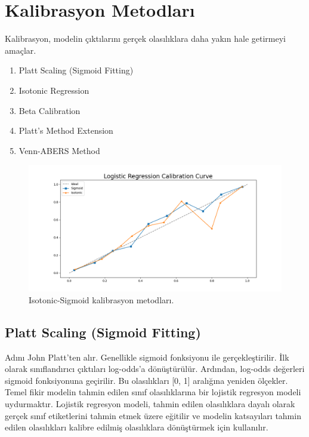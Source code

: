 \section{Kalibrasyon Metodları}
Kalibrasyon, modelin çıktılarını gerçek olasılıklara daha yakın hale getirmeyi amaçlar.
\begin{enumerate}
    \item Platt Scaling (Sigmoid Fitting)
    \item Isotonic Regression
    \item Beta Calibration
    \item Platt's Method Extension
    \item Venn-ABERS Method
\end{enumerate}

\begin{figure}[h]
    \centering
    \includegraphics[width=1\textwidth]{images/calibration.png}
    \caption{Isotonic-Sigmoid kalibrasyon metodları.}
    \label{fig:enter-label}
\end{figure}

\newpage

\subsection{Platt Scaling (Sigmoid Fitting)}
Adını John Platt'ten alır. Genellikle sigmoid fonksiyonu ile gerçekleştirilir. İlk olarak sınıflandırıcı çıktıları log-odds'a dönüştürülür. Ardından, log-odds değerleri sigmoid fonksiyonuna geçirilir. Bu olasılıkları [0, 1] aralığına yeniden ölçekler. Temel fikir modelin tahmin edilen sınıf olasılıklarına bir lojistik regresyon modeli uydurmaktır. Lojistik regresyon modeli, tahmin edilen olasılıklara dayalı olarak gerçek sınıf etiketlerini tahmin etmek üzere eğitilir ve modelin katsayıları tahmin edilen olasılıkları kalibre edilmiş olasılıklara dönüştürmek için kullanılır.

